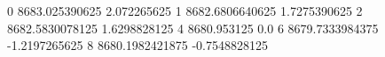 0 8683.025390625 2.072265625
1 8682.6806640625 1.7275390625
2 8682.5830078125 1.6298828125
4 8680.953125 0.0
6 8679.7333984375 -1.2197265625
8 8680.1982421875 -0.7548828125
